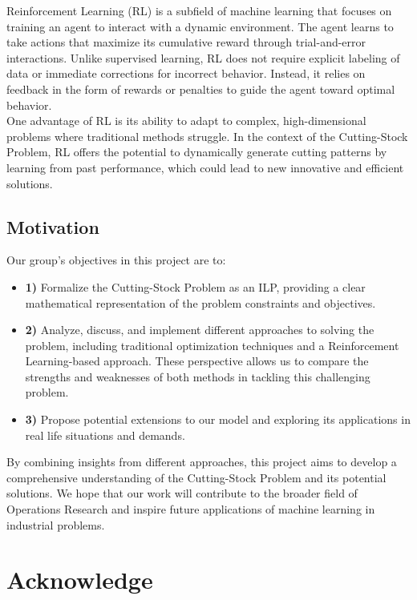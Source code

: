 \documentclass[a4paper]{article}
\begin{document}
    Reinforcement Learning (RL) is a subfield of machine learning that focuses on training an agent to interact with a dynamic environment. The agent learns to take actions that maximize its cumulative reward through trial-and-error interactions. Unlike supervised learning, RL does not require explicit labeling of data or immediate corrections for incorrect behavior. Instead, it relies on feedback in the form of rewards or penalties to guide the agent toward optimal behavior.
    \vspace{0.2cm}\\
    One advantage of RL is its ability to adapt to complex, high-dimensional problems where traditional methods struggle. In the context of the Cutting-Stock Problem, RL offers the potential to dynamically generate cutting patterns by learning from past performance, 
    which could lead to new innovative and efficient solutions.

    \subsection{Motivation}

    Our group’s objectives in this project are to:

    \begin{itemize}
        \item \textbf{1)} Formalize the Cutting-Stock Problem as an ILP, providing a clear mathematical representation of the problem constraints and objectives.
        \item \textbf{2)} Analyze, discuss, and implement different approaches to solving the problem, including traditional optimization techniques and a Reinforcement Learning-based approach. 
        These perspective allows us to compare the strengths and weaknesses of both methods in tackling this challenging problem.
        \item \textbf{3)} Propose potential extensions to our model and exploring its applications in real life situations and demands.
    \end{itemize}

    \noindent By combining insights from different approaches, this project aims to develop a comprehensive understanding of the Cutting-Stock Problem and its potential solutions. 
    We hope that our work will contribute to the broader field of Operations Research and inspire future applications of machine learning in industrial problems.

    \pagebreak
    \section{Acknowledge}
\end{document}
